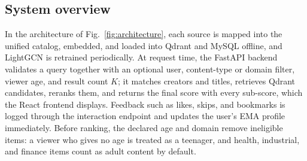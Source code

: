 \documentclass[3p,times,procedia]{elsarticle}
\begin{document}
\subsection{System overview}
\label{sec:overview}
In the architecture of Fig.~\ref{fig:architecture}, each source is mapped into the unified catalog, embedded, and loaded into Qdrant and MySQL offline, and LightGCN is retrained periodically. At request time, the FastAPI backend validates a query together with an optional user, content-type or domain filter, viewer age, and result count $K$; it matches creators and titles, retrieves Qdrant candidates, reranks them, and returns the final score with every sub-score, which the React frontend displays. Feedback such as likes, skips, and bookmarks is logged through the interaction endpoint and updates the user's EMA profile immediately. Before ranking, the declared age and domain remove ineligible items: a viewer who gives no age is treated as a teenager, and health, industrial, and finance items count as adult content by default.
\end{document}
